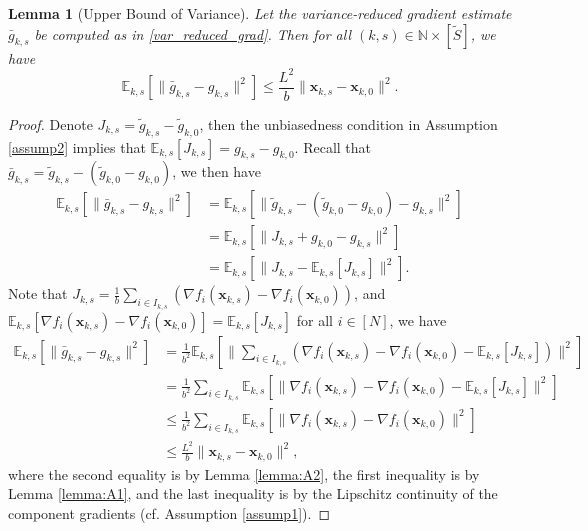 \documentclass{article}
\newcommand{\bx}{\boldsymbol{x}}
\newcommand{\barg}{\bar{g}}
\theoremstyle{plain}
\newtheorem{lemma}[theorem]{Lemma}
\theoremstyle{definition}
\theoremstyle{remark}
\begin{document}
\begin{lemma}[Upper Bound of Variance]\label{lem:Upper Bound of Variance}
Let the variance-reduced gradient estimate $\barg_{k,s}$ be computed as in \eqref{var_reduced_grad}. Then for all $(k,s) \in \mathbb{N} \times [\tilde{S}]$, we have
\begin{equation*}
    \mathbb{E}_{k,s}[\|\barg_{k,s} - g_{k,s}\|^2] \leq \frac{L^2}{b}\|\bx_{k,s} - \bx_{k,0}\|^2.
\end{equation*}
\end{lemma}
\begin{proof}
Denote $J_{k,s} = \tilde{g}_{k,s}- \tilde{g}_{k,0}$, then the unbiasedness condition in Assumption \ref{assump2} implies that $\mathbb{E}_{k,s}[J_{k,s}] = g_{k,s} - g_{k,0}$. Recall that $\barg_{k,s}=\tilde{g}_{k,s} - (\tilde{g}_{k,0} - g_{k,0})$, we then have
\begin{align*}
    \mathbb{E}_{k,s}[\|\barg_{k,s} - g_{k,s}\|^2] &= \mathbb{E}_{k,s}[\|\tilde{g}_{k,s} - (\tilde{g}_{k,0} - g_{k,0}) - g_{k,s}\|^2]\\
    & =\mathbb{E}_{k,s}[\|J_{k,s} + g_{k,0} - g_{k,s}\|^2] \\
    &= \mathbb{E}_{k,s}[\|J_{k,s} - \mathbb{E}_{k,s}[J_{k,s}]\|^2]. 
\end{align*}
Note that $J_{k,s} = \frac{1}{b}\sum_{i\in I_{k,s}}(\nabla f_i(\bx_{k,s})-\nabla f_i(\bx_{k,0}))$, and $\mathbb{E}_{k,s}[\nabla f_i(\bx_{k,s})-\nabla f_i(\bx_{k,0})] = \mathbb{E}_{k,s}[J_{k,s}]$ for all $i\in [N]$, we have 
\begin{align*}
    \mathbb{E}_{k,s}[\|\barg_{k,s} - g_{k,s}\|^2] &= \frac{1}{b^2}\mathbb{E}_{k,s}[\|\sum_{i\in I_{k,s}}(\nabla f_i(\bx_{k,s}) - \nabla f_i(\bx_{k,0}) - \mathbb{E}_{k,s}[J_{k,s}])\|^2] \\
    &= \frac{1}{b^2}\sum_{i\in I_{k,s}}\mathbb{E}_{k,s}[\|\nabla f_i(\bx_{k,s}) - \nabla f_i(\bx_{k,0}) - \mathbb{E}_{k,s}[J_{k,s}]\|^2] \\
    &\leq \frac{1}{b^2}\sum_{i\in I_{k,s}} \mathbb{E}_{k,s}[\|\nabla f_i(\bx_{k,s}) - \nabla f_i(\bx_{k,0})\|^2] \\
    &\leq \frac{L^2}{b}\|\bx_{k,s} - \bx_{k,0}\|^2,
\end{align*}
where the second equality is by Lemma \ref{lemma:A2}, the first inequality is by Lemma \ref{lemma:A1}, and the last inequality is by the Lipschitz continuity of the component gradients (cf. Assumption \ref{assump1}).
\end{proof}
\end{document}
